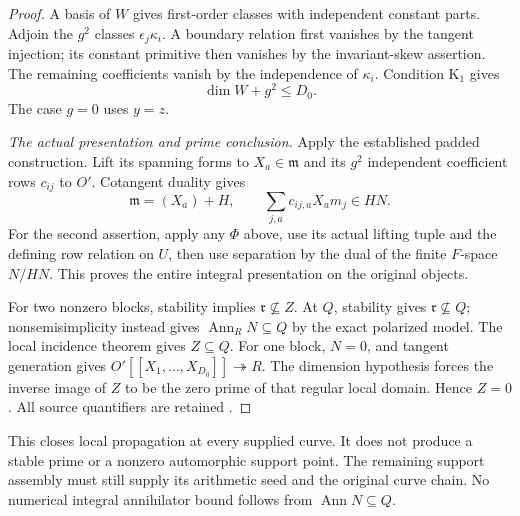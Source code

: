 \begin{proof}
A basis of \(W\) gives first-order classes with independent
constant parts.  Adjoin the \(g^2\) classes \(\epsilon_j\kappa_i\).
A boundary relation first vanishes by the tangent injection; its
constant primitive then vanishes by the invariant-skew assertion.
The remaining coefficients vanish by the independence of
\(\kappa_i\).  Condition \(\mathrm K_1\) gives
\[
                         \dim W+g^2\leq D_0.
\]
The case \(g=0\) uses \(y=z\).

\emph{The actual presentation and prime conclusion.}
Apply the established padded construction.  Lift its spanning
forms to \(X_a\in\mathfrak m\) and its \(g^2\) independent
coefficient rows \(c_{ij}\) to \(O'\).  Cotangent duality gives
\[
 \mathfrak m=(X_a)+H,\qquad
             \sum_{j,a}c_{ij,a}X_am_j\in HN.
\]
For the second assertion, apply any \(\Phi\) above, use its
actual lifting tuple and the defining row relation on \(U\),
then use separation by the dual of the finite \(F\)-space \(N/HN\).
This proves the entire integral presentation on the original objects.

For two nonzero blocks, stability implies
\(\mathfrak r\nsubseteq Z\).  At \(Q\), stability gives
\(\mathfrak r\nsubseteq Q\); nonsemisimplicity instead gives
\(\operatorname{Ann}_RN\subseteq Q\) by the exact polarized model.
The local incidence theorem gives \(Z\subseteq Q\).
For one block, \(N=0\), and tangent generation gives
\(O'[[X_1,\ldots,X_{D_0}]]\twoheadrightarrow R\).
The dimension hypothesis forces the inverse image of \(Z\) to be
the zero prime of that regular local domain.  Hence \(Z=0\).
All source quantifiers are retained \cite{SelmerLocalPropagationSource}.
\end{proof}

This closes local propagation at every supplied curve.  It does
not produce a stable prime or a nonzero automorphic support point.
The remaining support assembly must still supply its arithmetic seed
and the original curve chain.  No numerical integral annihilator
bound follows from \(\operatorname{Ann}N\subseteq Q\).
